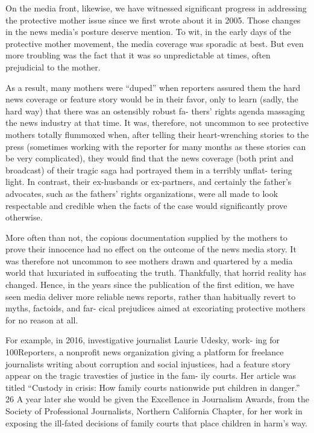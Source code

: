 
On the media front, likewise, we have witnessed significant progress in
addressing the protective mother issue since we first wrote about it in
2005. Those changes in the news media’s posture deserve mention. To
wit, in the early days of the protective mother movement, the media
coverage was sporadic at best. But even more troubling was the fact that
it was so unpredictable at times, often prejudicial to the mother. \pfl{}


As a result, many mothers were “duped” when reporters assured them
the hard news coverage or feature story would be in their favor, only
to learn (sadly, the hard way) that there was an ostensibly robust fa-
thers’ rights agenda massaging the news industry at that time. It was,
therefore, not uncommon to see protective mothers totally flummoxed
when, after telling their heart-wrenching stories to the press (sometimes
working with the reporter for many months as these stories can be very
complicated), they would find that the news coverage (both print and
broadcast) of their tragic saga had portrayed them in a terribly unflat-
tering light. In contrast, their ex-husbands or ex-partners, and certainly
the father’s advocates, such as the fathers’ rights organizations, were all
made to look respectable and credible when the facts of the case would
significantly prove otherwise. \pfl{}


More often than not, the copious documentation supplied by the
mothers to prove their innocence had no effect on the outcome of the
news media story. It was therefore not uncommon to see mothers drawn
and quartered by a media world that luxuriated in suffocating the truth.
Thankfully, that horrid reality has changed. Hence, in the years since the
publication of the first edition, we have seen media deliver more reliable
news reports, rather than habitually revert to myths, factoids, and far-
cical prejudices aimed at excoriating protective mothers for no reason
at all. \pfl{}


For example, in 2016, investigative journalist Laurie Udesky, work-
ing for 100Reporters, a nonprofit news organization giving a platform
for freelance journalists writing about corruption and social injustices,
had a feature story appear on the tragic travesties of justice in the fam-
ily courts. Her article was titled “Custody in crisis: How family courts
nationwide put children in danger.” 26 A year later she would be given
the Excellence in Journalism Awards, from the Society of Professional
Journalists, Northern California Chapter, for her work in exposing the
ill-fated decisions of family courts that place children in harm’s way. \pfl{}


